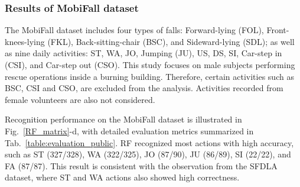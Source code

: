 \documentclass[journal,twoside,web]{ieeecolor}
\begin{document}
\begin{table}[h!]
    \caption{Comparison of the performance of RF on public datasets.}
    \label{table:evaluation_public}
    \footnotesize
    \renewcommand{\arraystretch}{1.2} %
\end{table}

\subsubsection{Results of MobiFall dataset}

 The MobiFall dataset includes four types of falls: Forward-lying (FOL), Front-knees-lying (FKL), Back-sitting-chair (BSC), and Sideward-lying (SDL); as well as nine daily activities: ST, WA, JO, Jumping (JU), US, DS, SI, Car-step in (CSI), and Car-step out (CSO). This study focuses on male subjects performing rescue operations inside a burning building. Therefore, certain activities such as BSC, CSI and CSO, are excluded from the analysis. Activities recorded from female volunteers are also not considered. 
 
Recognition performance on the MobiFall dataset is illustrated in Fig.~\ref{RF_matrix}-d, with detailed evaluation metrics summarized in Tab.~\ref{table:evaluation_public}. RF recognized most actions with high accuracy, such as ST (327/328), WA (322/325), JO (87/90), JU (86/89), SI (22/22), and FA (87/87). This result is consistent with the observation from the SFDLA dataset, where ST and WA actions also showed high correctness.
\end{document}

